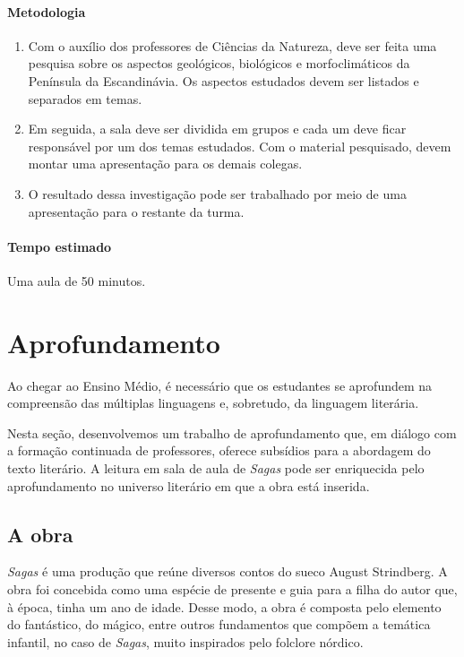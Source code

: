 \documentclass[12pt]{extarticle}
\begin{document}
\paragraph{Metodologia}

\begin{enumerate}

\item Com o auxílio dos professores de Ciências da Natureza,
deve ser feita uma pesquisa sobre os aspectos geológicos, biológicos e morfoclimáticos
da Península da Escandinávia. Os aspectos estudados devem ser listados
e separados em temas.

\item Em seguida, a sala deve ser dividida em grupos e cada um deve ficar
responsável por um dos temas estudados. Com o material pesquisado,
devem montar uma apresentação para os demais colegas.

\item O resultado dessa investigação pode ser trabalhado por meio de 
uma apresentação para o restante da turma.

\end{enumerate}

\paragraph{Tempo estimado} Uma aula de 50 minutos.


\section{Aprofundamento}

Ao chegar ao Ensino Médio, é necessário que os estudantes se aprofundem
na compreensão das múltiplas linguagens e, sobretudo, da linguagem
literária.

Nesta seção, desenvolvemos um trabalho de aprofundamento que, em diálogo
com a formação continuada de professores, oferece subsídios para a
abordagem do texto literário. A leitura em sala de aula de \emph{Sagas}
pode ser enriquecida pelo aprofundamento no universo literário em que a
obra está inserida.

\subsection{A obra}

\emph{Sagas} é uma produção que reúne diversos contos do sueco August
Strindberg. A obra foi concebida como uma espécie de presente e guia
para a filha do autor que, à época, tinha um ano de idade. Desse modo, a
obra é composta pelo elemento do fantástico, do mágico, entre outros
fundamentos que compõem a temática infantil, no caso de \emph{Sagas}, muito
inspirados pelo folclore nórdico.
\end{document}
